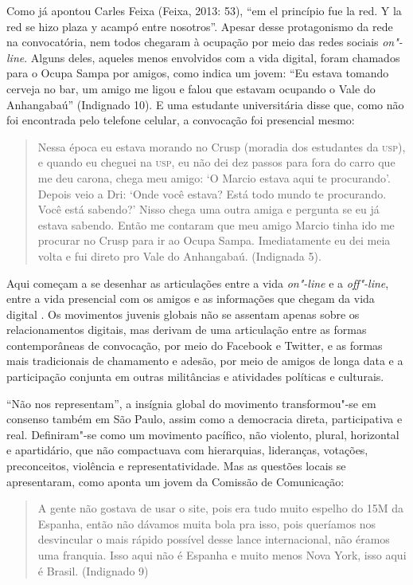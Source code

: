 Como já apontou Carles Feixa (Feixa, 2013: 53), ``em el princípio fue la
red. Y la red se hizo plaza y acampó entre nosotros''. Apesar desse
protagonismo da rede na convocatória, nem todos chegaram à ocupação por
meio das redes sociais \emph{on"-line}. Alguns deles, aqueles menos
envolvidos com a vida digital, foram chamados para o Ocupa Sampa por
amigos, como indica um jovem: ``Eu estava tomando cerveja no bar, um
amigo me ligou e falou que estavam ocupando o Vale do Anhangabaú''
(Indignado 10). E uma estudante universitária disse que, como não foi
encontrada pelo telefone celular, a convocação foi presencial mesmo:

\begin{quote}
Nessa época eu estava morando no Crusp (moradia dos estudantes da \textsc{usp}),
e quando eu cheguei na \textsc{usp}, eu não dei dez passos para fora do carro que
me deu carona, chega meu amigo: `O Marcio estava aqui te procurando'.
Depois veio a Dri: `Onde você estava? Está todo mundo te procurando.
Você está sabendo?' Nisso chega uma outra amiga e pergunta se eu já
estava sabendo. Então me contaram que meu amigo Marcio tinha ido me
procurar no Crusp para ir ao Ocupa Sampa. Imediatamente eu dei meia
volta e fui direto pro Vale do Anhangabaú. (Indignada 5).
\end{quote}

Aqui começam a se desenhar as articulações entre a vida \emph{on"-line} e
a \emph{off"-line}, entre a vida presencial com os amigos e as
informações que chegam da vida digital . Os movimentos juvenis globais
não se assentam apenas sobre os relacionamentos digitais, mas derivam de
uma articulação entre as formas contemporâneas de convocação, por meio
do Facebook e Twitter, e as formas mais tradicionais de chamamento e
adesão, por meio de amigos de longa data e a participação conjunta em
outras militâncias e atividades políticas e culturais.

``Não nos representam'', a insígnia global do movimento transformou"-se
em consenso também em São Paulo, assim como a democracia direta,
participativa e real. Definiram"-se como um movimento pacífico, não
violento, plural, horizontal e apartidário, que não compactuava com
hierarquias, lideranças, votações, preconceitos, violência e
representatividade. Mas as questões locais se apresentaram, como aponta
um jovem da Comissão de Comunicação:

\begin{quote}
A gente não gostava de usar o site, pois era tudo muito espelho do 15M
da Espanha, então não dávamos muita bola pra isso, pois queríamos nos
desvincular o mais rápido possível desse lance internacional, não éramos
uma franquia. Isso aqui não é Espanha e muito menos Nova York, isso aqui
é Brasil. (Indignado 9)
\end{quote}

